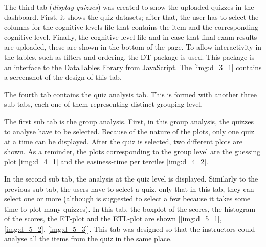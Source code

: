 \vspace{4 mm}
\vspace{2 mm}

The third tab (\textit{display quizzes}) was created to show the uploaded quizzes in the dashboard. First, it shows the quiz datasets; after that, the user has to select the columns for the cognitive levels file that contains the item and the corresponding cognitive level. Finally, the cognitive level file and in case that final exam results are uploaded, these are shown in the bottom of the page. To allow interactivity in the tables, such as filters and ordering, the DT package is used. This package is an interface to the DataTables library from JavaScript. The \cref{img:d_3_1} contains a screenshot of the design of this tab.

\vspace{4 mm}
\vspace{2 mm}

The fourth tab contains the quiz analysis tab. This is formed with another three sub tabs, each one of them representing distinct grouping level. 

\vspace{4 mm}
\vspace{2 mm}

The first sub tab is the group analysis. First, in this group analysis, the quizzes to analyse have to be selected. Because of the nature of the plots, only one quiz at a time can be displayed. After the quiz is selected, two different plots are shown. As a reminder, the plots corresponding to the group level are the guessing plot \cref{img:d_4_1}  and the easiness-time per terciles  \cref{img:d_4_2}.

\vspace{4 mm}
\vspace{2 mm}

In the second sub tab, the analysis at the quiz level is displayed. Similarly to the previous sub tab, the users have to select a quiz, only that in this tab, they can select one or more (although is suggested to select a few because it takes some time to plot many quizzes). In this tab, the boxplot of the scores, the histogram of the scores, the ET-plot and the ETL-plot are shown [\cref{img:d_5_1}, \cref{img:d_5_2}, \cref{img:d_5_3}]. This tab was designed so that the instructors could analyse all the items from the quiz in the same place.

